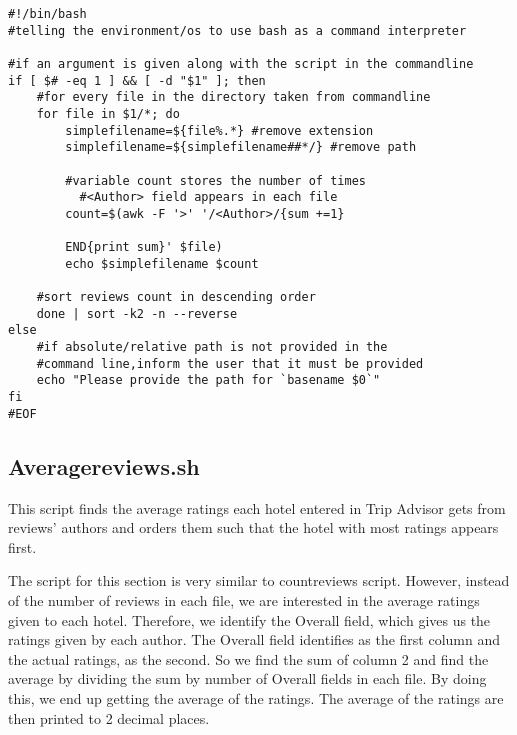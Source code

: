 \documentclass{article}
\begin{document}
\medskip
\begin{lstlisting}[caption= countreviews.sh]
#!/bin/bash
#telling the environment/os to use bash as a command interpreter

#if an argument is given along with the script in the commandline
if [ $# -eq 1 ] && [ -d "$1" ]; then
    #for every file in the directory taken from commandline
    for file in $1/*; do
        simplefilename=${file%.*} #remove extension
        simplefilename=${simplefilename##*/} #remove path

        #variable count stores the number of times
    	  #<Author> field appears in each file
        count=$(awk -F '>' '/<Author>/{sum +=1}

        END{print sum}' $file)
        echo $simplefilename $count

    #sort reviews count in descending order
    done | sort -k2 -n --reverse
else
    #if absolute/relative path is not provided in the
    #command line,inform the user that it must be provided
    echo "Please provide the path for `basename $0`"
fi
#EOF
\end{lstlisting}
\subsection{Averagereviews.sh}

This script finds the average ratings each hotel entered in Trip Advisor gets from reviews' authors and orders them such that the hotel with most ratings appears first.

The script for this section is very similar to countreviews script. However, instead of the number of reviews in each file, we are interested in the average ratings given to each hotel. Therefore, we identify the Overall field, which gives us the ratings given by each author. The Overall field identifies as the first column and the actual ratings, as the second. So we find the sum of column 2 and find the average by dividing the sum by number of Overall fields in each file. By doing this, we end up getting the average of the ratings. The average of the ratings are then printed to 2 decimal places.
\end{document}
